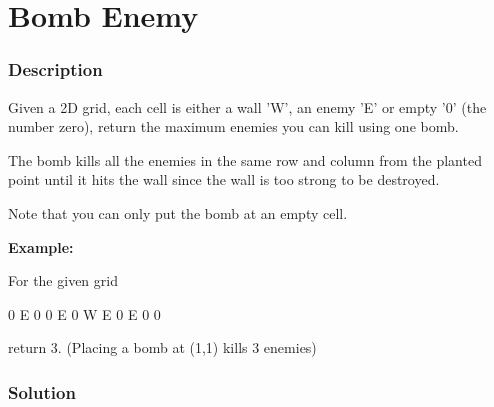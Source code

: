 \begin{Code}

\end{Code}

\newpage

\section{Bomb Enemy} %

\subsubsection{Description}
Given a 2D grid, each cell is either a wall 'W', an enemy 'E' or empty '0' (the number zero), return the maximum enemies you can kill using one bomb.

The bomb kills all the enemies in the same row and column from the planted point until it hits the wall since the wall is too strong to be destroyed.

Note that you can only put the bomb at an empty cell.

\textbf{Example:}

For the given grid
\begin{Code}
0 E 0 0
E 0 W E
0 E 0 0
\end{Code}

return 3. (Placing a bomb at (1,1) kills 3 enemies)

\newpage

\subsubsection{Solution}

